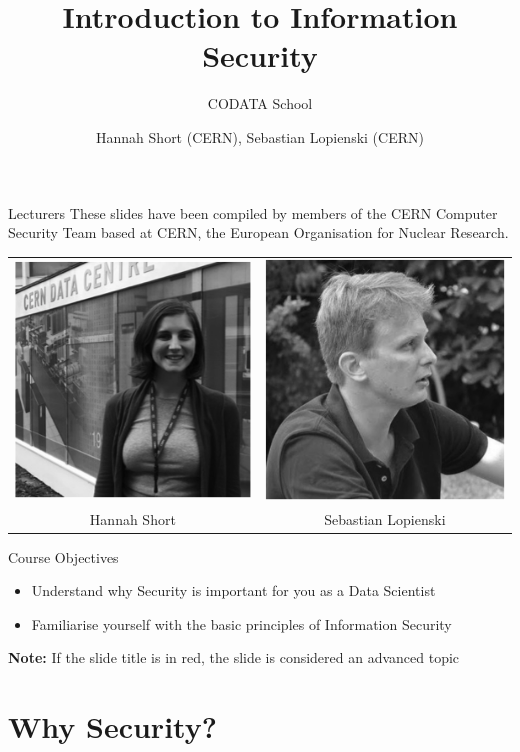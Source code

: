 \documentclass{beamer}
\author{Hannah Short (CERN), Sebastian Lopienski (CERN)}
\title{Introduction to Information Security}
\subtitle{CODATA School}
\begin{document}
\frontcover

\frame{\titlepage}

\frame{\tableofcontents}

\begin{frame}{Lecturers}
These slides have been compiled by members of the CERN Computer Security Team based at CERN, the European Organisation for Nuclear Research.
\begin{center}
\begin{tabular}{ c c  }
 \includegraphics[width=0.2\linewidth]{lecturer1.png} & \includegraphics[width=0.2\linewidth]{Lecturer2.png}  \\ 
 Hannah Short & Sebastian Lopienski  \\  
\end{tabular}
\end{center}
\end{frame}

\begin{frame}{Course Objectives}
	\begin{itemize}
		\item Understand why Security is important for you as a Data Scientist
		\item Familiarise yourself with the basic principles of Information Security
	\end{itemize}
\textbf{Note:} \newline
\textit{}{If the slide title is in {\color{red}red}, the slide is considered an advanced topic}
\end{frame}

\section{Why Security?}
\frame{\sectionpage}
\end{document}
